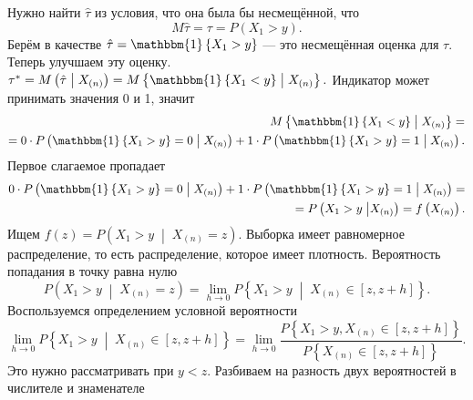 Нужно найти $ \hat{ \tau }$ из условия, что она была бы несмещённой,
что
$$M \hat{ \tau } =
  \tau =
  P \left( X_1 > y \right).$$
Берём в качестве $ \hat{ \tau } = \mathbbm{1} \left\{ X_1 > y \right\} $ ---
это несмещённая оценка для $ \tau $.
Теперь улучшаем эту оценку.
$ \tau^* =
  M \left( \hat{ \tau } \; \middle| \; X_{ \left( n \right) } \right) =
  M \left\{ \mathbbm{1} \left\{ X_1 < y \right\} \; \middle| \; X_{ \left( n \right) } \right\}.$
Индикатор может принимать значения 0 и 1,
значит
\begin{equation*}
  \begin{split}
    M \left\{
      \mathbbm{1} \left\{ X_1 < y \right\} \; \middle| \; X_{ \left( n \right) }
    \right\} = \\
    = 0 \cdot
    P \left(
      \mathbbm{1} \left\{ X_1 > y \right\} = 0 \; \middle| \; X_{ \left( n \right) }
    \right) +
    1 \cdot
    P \left( \mathbbm{1} \left\{ X_1 > y \right\} = 1 \; \middle| \; X_{ \left( n \right) } \right).
  \end{split}
\end{equation*}
Первое слагаемое пропадает
\begin{equation*}
  \begin{split}
    0 \cdot
    P \left(
      \mathbbm{1} \left\{ X_1 > y \right\} = 0 \; \middle| \; X_{ \left( n \right) }
    \right) +
    1 \cdot
    P \left(
      \mathbbm{1} \left\{ X_1 > y \right\} = 1 \; \middle| \; X_{ \left( n \right) }
    \right) = \\
    = P \left( X_1 > y \; \middle| X_{ \left( n \right) } \right) =
    f \left( X_{ \left( n \right) } \right).
  \end{split}
\end{equation*}
Ищем $f \left( z \right) = P \left( X_1 > y \; \middle| \; X_{ \left( n \right) } = z \right).$
Выборка имеет равномерное распределение, то есть распределение, которое имеет плотность.
Вероятность попадания в точку равна нулю
$$ P \left( X_1 > y \; \middle| \; X_{ \left( n \right) } = z \right) =
  \lim \limits_{h \to 0}
    P \left\{ X_1 > y \; \middle| \; X_{ \left( n \right) } \in \left[ z, z + h \right] \right\}.$$
Воспользуемся определением условной вероятности
$$ \lim \limits_{h \to 0}
    P \left\{ X_1 > y \; \middle| \; X_{ \left( n \right) } \in \left[ z, z + h \right] \right\} =
  \lim \limits_{h \to 0}
    \frac{P \left\{ X_1 > y, X_{ \left( n \right) } \in \left[ z, z + h \right] \right\} }{P \left\{ X_{ \left( n \right) } \in \left[ z, z + h \right] \right\} }.$$
Это нужно рассматривать при $y < z$.
Разбиваем на разность двух вероятностей в числителе и знаменателе
